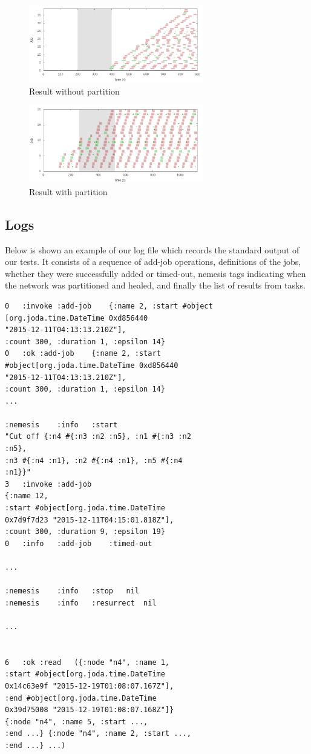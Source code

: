 \documentclass[letterpaper,twocolumn,10pt]{article}
\begin{document}
\begin{figure}
\centering
\includegraphics[width=3in]{aurora}
\caption{Result without partition}
\label{fig:my_label}
\end{figure}



\begin{figure}
\centering
\includegraphics[width=3in]{aurora-partition}
\caption{Result with partition}
\label{fig:my_label}
\end{figure}

\subsection{Logs}
Below is shown an example of our log file which records the standard output of our tests. It consists of a sequence of add-job operations, definitions of the jobs, whether they were successfully added or timed-out, nemesis tags indicating when the network was partitioned and healed, and finally the list of results from tasks.

\begin{verbatim}
0	:invoke	:add-job	{:name 2, :start #object
[org.joda.time.DateTime 0xd856440
"2015-12-11T04:13:13.210Z"], 
:count 300, :duration 1, :epsilon 14}
0	:ok	:add-job	{:name 2, :start
#object[org.joda.time.DateTime 0xd856440
"2015-12-11T04:13:13.210Z"], 
:count 300, :duration 1, :epsilon 14}
...

:nemesis	:info	:start	
"Cut off {:n4 #{:n3 :n2 :n5}, :n1 #{:n3 :n2
:n5}, 
:n3 #{:n4 :n1}, :n2 #{:n4 :n1}, :n5 #{:n4
:n1}}"
3	:invoke	:add-job	
{:name 12, 
:start #object[org.joda.time.DateTime
0x7d9f7d23 "2015-12-11T04:15:01.818Z"], 
:count 300, :duration 9, :epsilon 19}
0	:info	:add-job	:timed-out

...

:nemesis	:info	:stop	nil
:nemesis	:info	:resurrect	nil

...


6	:ok	:read	({:node "n4", :name 1, 
:start #object[org.joda.time.DateTime 
0x14c63e9f "2015-12-19T01:08:07.167Z"], 
:end #object[org.joda.time.DateTime 
0x39d75008 "2015-12-19T01:08:07.168Z"]} 
{:node "n4", :name 5, :start ..., 
:end ...} {:node "n4", :name 2, :start ..., 
:end ...} ...)

\end{verbatim}
\end{document}
